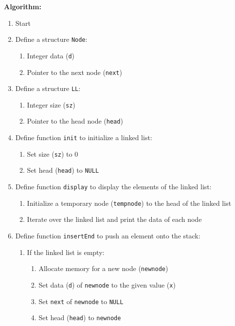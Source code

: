 \documentclass{article}
\begin{document}
\textbf{Algorithm:}
\begin{enumerate}
  \item Start
  \item Define a structure \texttt{Node}:
    \begin{enumerate}
      \item Integer data (\texttt{d})
      \item Pointer to the next node (\texttt{next})
    \end{enumerate}
  \item Define a structure \texttt{LL}:
    \begin{enumerate}
      \item Integer size (\texttt{sz})
      \item Pointer to the head node (\texttt{head})
    \end{enumerate}
  \item Define function \texttt{init} to initialize a linked list:
    \begin{enumerate}
      \item Set size (\texttt{sz}) to 0
      \item Set head (\texttt{head}) to \texttt{NULL}
    \end{enumerate}
  \item Define function \texttt{display} to display the elements of the linked list:
    \begin{enumerate}
      \item Initialize a temporary node (\texttt{tempnode}) to the head of the linked list
      \item Iterate over the linked list and print the data of each node
    \end{enumerate}
  \item Define function \texttt{insertEnd} to push an element onto the stack:
    \begin{enumerate}
      \item If the linked list is empty:
        \begin{enumerate}
          \item Allocate memory for a new node (\texttt{newnode})
          \item Set data (\texttt{d}) of \texttt{newnode} to the given value (\texttt{x})
          \item Set \texttt{next} of \texttt{newnode} to \texttt{NULL}
          \item Set head (\texttt{head}) to \texttt{newnode}
        \end{enumerate}

\end{enumerate}
\end{enumerate}
\end{document}
